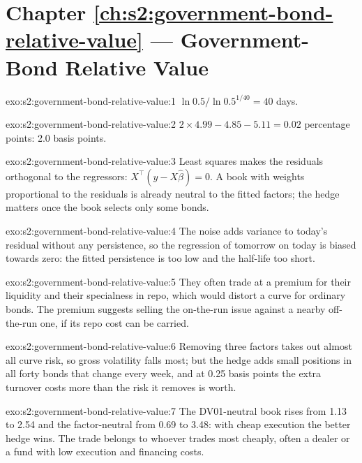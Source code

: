 \section*{Chapter \ref{ch:s2:government-bond-relative-value} --- Government-Bond Relative Value}

\begin{solution}{exo:s2:government-bond-relative-value:1}
$\ln 0.5/\ln 0.5^{1/40} = 40$ days.
\end{solution}

\begin{solution}{exo:s2:government-bond-relative-value:2}
$2 \times 4.99 - 4.85 - 5.11 = 0.02$ percentage points: 2.0 basis points.
\end{solution}

\begin{solution}{exo:s2:government-bond-relative-value:3}
Least squares makes the residuals orthogonal to the regressors: $X^\top(y - X\hat\beta) = 0$. A book with weights proportional to the residuals is
already neutral to the fitted factors; the hedge matters once the book selects only some bonds.
\end{solution}

\begin{solution}{exo:s2:government-bond-relative-value:4}
The noise adds variance to today's residual without any persistence, so the regression of tomorrow on today is biased towards zero: the fitted
persistence is too low and the half-life too short.
\end{solution}

\begin{solution}{exo:s2:government-bond-relative-value:5}
They often trade at a premium for their liquidity and their specialness in repo, which would distort a curve for ordinary bonds. The premium
suggests selling the on-the-run issue against a nearby off-the-run one, if its repo cost can be carried.
\end{solution}

\begin{solution}{exo:s2:government-bond-relative-value:6}
Removing three factors takes out almost all curve risk, so gross volatility falls most; but the hedge adds small positions in all forty bonds that
change every week, and at 0.25 basis points the extra turnover costs more than the risk it removes is worth.
\end{solution}

\begin{solution}{exo:s2:government-bond-relative-value:7}
The DV01-neutral book rises from 1.13 to 2.54 and the factor-neutral from 0.69 to 3.48: with cheap execution the better hedge wins. The trade belongs to
whoever trades most cheaply, often a dealer or a fund with low execution and financing costs.
\end{solution}

